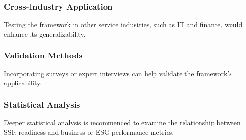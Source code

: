 \subsubsection{Cross-Industry Application}
Testing the framework in other service industries, such as IT and finance, would enhance its generalizability.

\subsubsection{Validation Methods}
Incorporating surveys or expert interviews can help validate the framework's applicability.

\subsubsection{Statistical Analysis}
Deeper statistical analysis is recommended to examine the relationship between SSR readiness and business or ESG performance metrics.